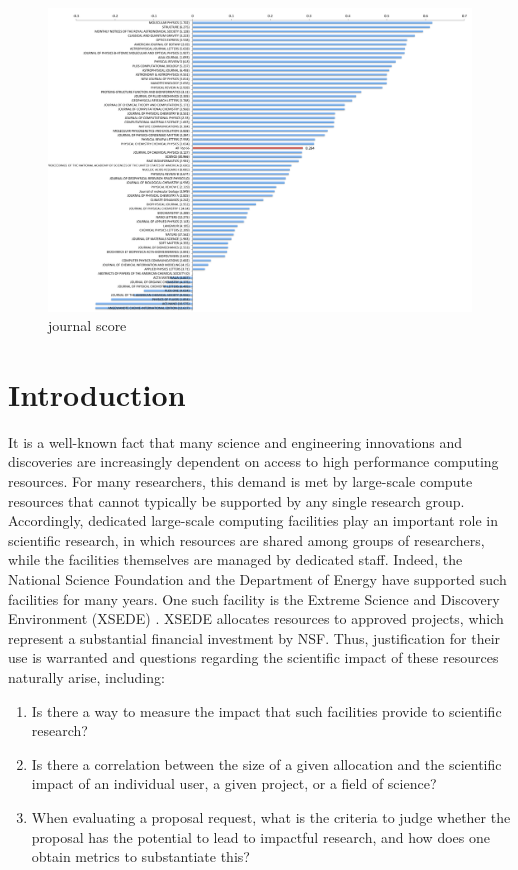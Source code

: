 \documentclass{sig-alternate}
\begin{document}
\begin{figure}[htb] 
  \centering 
    \includegraphics[width=1.0\textwidth]{images-new/journals_bar_by_score.pdf} 
  \caption{journal score}\label{F:jounarl-score} 
\end{figure} 


\section{Introduction} 

It is a well-known fact that many science and engineering innovations and discoveries are increasingly dependent on access to high performance computing resources. For many researchers, this demand is met by large-scale compute resources that cannot typically be supported by any single research group. Accordingly, dedicated large-scale computing facilities play an important role in scientific research, in which resources are shared among groups of researchers, while the facilities themselves are managed by dedicated staff. Indeed, the National Science Foundation and the Department of Energy have supported such facilities for many years. One such facility is the Extreme Science and Discovery Environment (XSEDE) \cite{www-xsede}. XSEDE allocates resources to approved projects, which represent a substantial financial investment by NSF. Thus, justification for their use is warranted and questions regarding the scientific impact of these resources naturally arise, including:

\begin{enumerate}

\item Is there a way to measure the impact that such facilities provide to scientific research?

 \item Is there a correlation between the size of a given allocation and the scientific impact of an individual user, a given project, or a field of science?

\item When evaluating a proposal request, what is the criteria to judge whether the proposal has the potential to lead to impactful research, and how does one obtain metrics to substantiate this?

\end{enumerate} 
\end{document}
